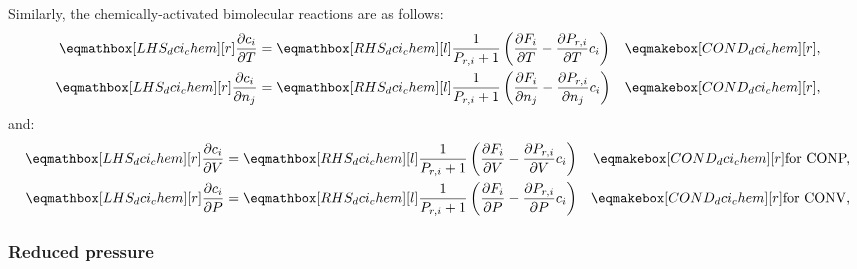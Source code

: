 \documentclass[12pt]{article}
\newcommand{\conp}{CONP}
\newcommand{\conv}{CONV}
\newcommand{\dconp}{\ifmmode\text{for \conp,}\else for \conp,\fi}
\newcommand{\dconv}{\ifmmode\text{for \conv,}\else for \conv,\fi}
\begin{document}
Similarly, the chemically-activated bimolecular reactions are as follows:
\begin{align}
 \label{e:dci_chem_dt}
 \lhs{dci_chem}{\frac{\partial c_i }{\partial T }} &= \rhs{dci_chem}{\frac{1}{P_{r, i} + 1} \left(\frac{\partial F_{i} }{\partial T } - \frac{\partial P_{r, i} }{\partial T } c_{i}\right)} & \cond{dci_chem}{,} \\
 \label{e:dci_chem_dnj}
 \lhs{dci_chem}{\frac{\partial c_i }{\partial n_j }} &= \rhs{dci_chem}{\frac{1}{P_{r, i} + 1} \left(\frac{\partial F_{i} }{\partial n_j } - \frac{\partial P_{r, i} }{\partial n_j } c_{i}\right)} & \cond{dci_chem}{,}
\end{align}
and:
\begin{subequations}
 \label{e:dci_chem_de}
 \begin{align}
  \lhs{dci_chem}{\frac{\partial c_i }{\partial V }} &= \rhs{dci_chem}{\frac{1}{P_{r, i} + 1} \left(\frac{\partial F_{i} }{\partial V } - \frac{\partial P_{r, i} }{\partial V } c_{i}\right)} & \cond{dci_chem}{\dconp} \\
  \lhs{dci_chem}{\frac{\partial c_i }{\partial P }} &= \rhs{dci_chem}{\frac{1}{P_{r, i} + 1} \left(\frac{\partial F_{i} }{\partial P } - \frac{\partial P_{r, i} }{\partial P } c_{i}\right)} & \cond{dci_chem}{\dconv}
 \end{align}
\end{subequations}

\subsubsection{Reduced pressure}
\label{s:dpr}
\end{document}

